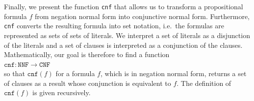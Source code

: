 Finally, we present the function \texttt{cnf} that allows us to transform a propositional formula $f$
from negation normal form into conjunctive normal form.
Furthermore, \texttt{cnf} converts the resulting formula
into set notation, i.e.~the formulas are represented as sets of sets of literals. 
We interpret a set of literals as a
disjunction of the literals and a set of clauses is interpreted as a conjunction
of the clauses.  Mathematically, our goal is therefore to find a function
\\[0.2cm]
\hspace*{1.3cm}
$\texttt{cnf}: \texttt{NNF} \rightarrow \texttt{CNF}$
\\[0.2cm]
so that $\texttt{cnf}(f)$ for a formula $f$, which is in negation normal form, returns a set of clauses as a result whose conjunction
is equivalent to $f$.  The definition of $\texttt{cnf}(f)$ is given recursively.
